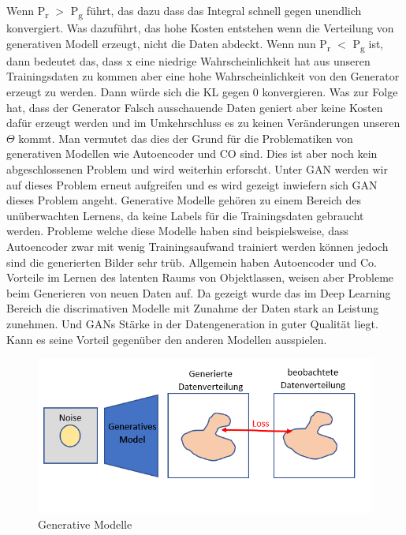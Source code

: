 \documentclass{llncs}
\begin{document}
Wenn  P\textsubscript{r} $>$ P\textsubscript{g} führt, das dazu dass das Integral schnell gegen unendlich konvergiert. Was dazuführt, das hohe Kosten entstehen wenn die  Verteilung von generativen Modell erzeugt, nicht die Daten abdeckt. Wenn nun  P\textsubscript{r} $<$ P\textsubscript{g} ist, dann bedeutet das, dass x eine niedrige Wahrscheinlichkeit hat aus unseren Trainingsdaten zu kommen aber eine hohe Wahrscheinlichkeit von den Generator erzeugt zu werden. Dann würde sich die KL gegen 0 konvergieren. Was zur Folge hat, dass der Generator Falsch ausschauende Daten geniert aber keine Kosten dafür erzeugt werden und im Umkehrschluss es zu keinen Veränderungen unseren $\Theta$ kommt. Man vermutet das dies der Grund für die Problematiken von generativen Modellen wie Autoencoder und CO sind. Dies ist aber noch kein abgeschlossenen Problem und wird weiterhin erforscht\cite{improvingan}.
Unter GAN werden wir auf dieses Problem erneut aufgreifen und es wird gezeigt inwiefern sich GAN dieses Problem angeht. Generative Modelle gehören zu einem Bereich des unüberwachten Lernens, da keine Labels für die Trainingsdaten gebraucht werden. Probleme welche diese Modelle haben sind beispielsweise, dass Autoencoder zwar mit wenig Trainingsaufwand trainiert werden können jedoch sind die generierten Bilder sehr trüb. Allgemein haben Autoencoder und Co. Vorteile  im Lernen des latenten Raums von Objektlassen, weisen aber Probleme beim Generieren von neuen Daten auf. Da gezeigt wurde das im Deep Learning Bereich die discrimativen Modelle mit Zunahme der Daten stark an Leistung zunehmen. Und GANs Stärke in der Datengeneration in guter Qualität liegt. Kann es seine Vorteil gegenüber den anderen Modellen ausspielen\cite{improvingan}.

\begin{figure}[htbp] 
	\centering
	\includegraphics[width=1.0\textwidth]{genmodel.png}
	\caption{Generative Modelle}
	\label{fig:Bild1}
\end{figure}
\end{document}
